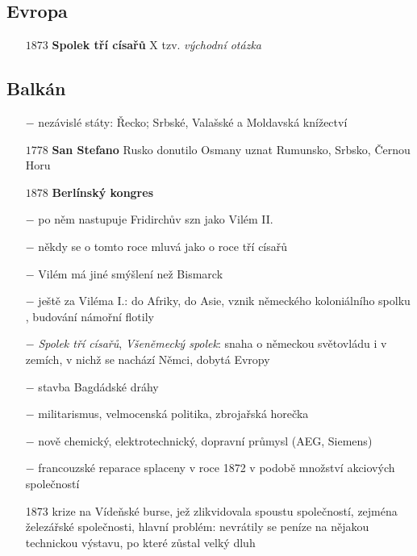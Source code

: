 \documentclass{article}
\begin{document}
\subsection*{Evropa}
\begin{itemize}
    \vspace{-0.5em}
    \setlength\itemsep{0.15em}
    \item[$1873$] \textbf{Spolek tří císařů} X tzv. \textit{východní otázka}
\end{itemize}

\subsection*{Balkán}
\begin{itemize}
  \item[$-$]nezávislé státy: Řecko; Srbské, Valašské a Moldavská knížectví
  \item[$1778$] \textbf{San Stefano} Rusko donutilo Osmany uznat Rumunsko, Srbsko, Černou Horu
  \item[$1878$]\textbf{Berlínský kongres} %
  \item[$-$] po něm nastupuje Fridirchův szn jako Vilém II.
  \item[$-$] někdy se o tomto roce mluvá jako o roce tří císařů
  \item[$-$] Vilém má jiné smýšlení než Bismarck
  \item[$-$] ještě za Viléma I.: do Afriky, do Asie, vznik německého koloniálního spolku , budování námořní flotily
  \item[$-$]  \textit{Spolek tří císařů}, \textit{Všeněmecký spolek}: snaha o německou světovládu i v zemích, v nichž se nachází Němci, dobytá Evropy
  \item[$-$] stavba Bagdádské dráhy
  \item[$-$] militarismus, velmocenská politika, zbrojařská horečka
  \item[$-$] nově chemický, elektrotechnický, dopravní průmysl (AEG, Siemens)
  \item[$-$] francouzské reparace splaceny v roce 1872 v podobě množství akciových společností
  \item[1873] krize  na Vídeňské burse, jež zlikvidovala spoustu společností, zejména železářské společnosti, hlavní problém: nevrátily se peníze na nějakou technickou výstavu, po které zůstal velký dluh
\end{itemize}
\end{document}

